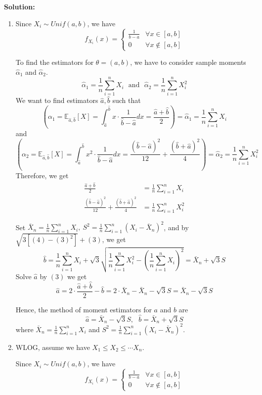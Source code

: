 \documentclass[13pt]{article}
\theoremstyle{definition}
\newenvironment{solution}
{\color{C2}\begin{framed}\begingroup\textbf{Solution:} }
  {\endgroup\end{framed}}
\theoremstyle{remark}
\newcommand{\EE}{\mathbb{E}}
\begin{document}
\begin{solution}

\begin{enumerate}[label=(\alph*),topsep=0pt]
        \item Since $X_i\sim Unif(a,b)$, we have
        \[
        f_{X_i}(x) = \begin{cases}\frac{1}{b-a} &\forall x\in [a,b]\\
        0  &\forall x\not \in [a,b]\end{cases}
        \]
        
        To find the estimators for $\theta = (a, b)$, we have to consider sample moments $\hat{\alpha}_1$ and $\hat{\alpha}_2$.
\[
\hat{\alpha}_1 = \frac{1}{n}\sum_{i=1}^n X_i \ \ \ \text{and} \ \ \ \hat{\alpha}_2 = \frac{1}{n}\sum_{i=1}^n X_i^2
\]
We want to find estimators $\hat{a}, \hat{b}$ such that
\[
\left(\alpha_1 = \EE_{\hat{a}, \hat{b}}[X]  = \int_{\hat{a}}^{\hat{b}} x\cdot \frac{1}{\hat{b}-\hat{a}} dx = \frac{\hat{a}+\hat{b}}{2}\right) = \hat{\alpha}_1 = \frac{1}{n}\sum_{i=1}^n X_i
\]
and
\[
\left(\alpha_2 = \EE_{\hat{a}, \hat{b}}[X]  = \int_{\hat{a}}^{\hat{b}} x^2\cdot \frac{1}{\hat{b}-\hat{a}} dx = \frac{(\hat{b}-\hat{a})^2}{12}+\frac{(\hat{b}+\hat{a})^2}{4}\right)= \hat{\alpha}_2 = \frac{1}{n}\sum_{i=1}^n X_i^2
\]
Therefore, we get
\begin{align}
    \frac{\hat{a}+\hat{b}}{2}  &= \frac{1}{n}\sum_{i=1}^n X_i\\
    \frac{(\hat{b}-\hat{a})^2}{12}+\frac{(\hat{b}+\hat{a})^2}{4}  &= \frac{1}{n}\sum_{i=1}^n X_i^2
\end{align}

Set $\bar{X}_n=\frac{1}{n}\sum_{i=1}^n X_i, \ S^2 = \frac{1}{n}\sum_{i=1}^n (X_i-\bar{X}_n)^2$, and by $\sqrt{3[(4)-(3)^2]}+(3)$, we get
\[
\hat{b} = \frac{1}{n}\sum_{i=1}^n X_i+\sqrt{3}\sqrt{\frac{1}{n}\sum_{i=1}^n X_i^2-(\frac{1}{n}\sum_{i=1}^n X_i)^2}= \bar{X}_n+ \sqrt{3}S
\]
Solve $\hat{a}$ by $(3)$ we get
\[
\hat{a}= 2\cdot \frac{\hat{a}+\hat{b}}{2} -\hat{b}  =2\cdot \bar{X}_n-\bar{X}_n- \sqrt{3}S= \bar{X}_n- \sqrt{3}S
\]

Hence, the method of moment estimators for $a$ and $b$ are
\[
\hat{a}= \bar{X}_n- \sqrt{3}S, \ \ \ \hat{b}  =\bar{X}_n+ \sqrt{3}S
\]
where $\bar{X}_n=\frac{1}{n}\sum_{i=1}^n X_i$ and $S^2 = \frac{1}{n}\sum_{i=1}^n (X_i-\bar{X}_n)^2$.
        \item WLOG, assume we have $X_1\le X_2\le \cdots X_n$. 
        
        Since $X_i\sim Unif(a,b)$, we have
        \[
        f_{X_i}(x) = \begin{cases}\frac{1}{b-a} &\forall x\in [a,b]\\
        0  &\forall x\not \in [a,b]\end{cases}
        \]
        

\end{enumerate}
\end{solution}
\end{document}
